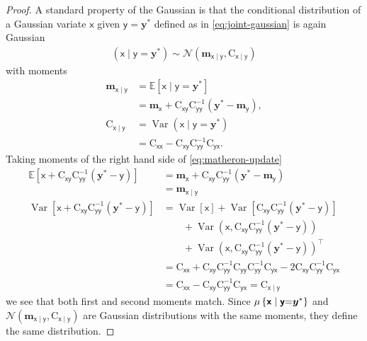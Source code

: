 \documentclass[wcp]{jmlr} %
\newcommand{\Ex}{\mathbb{E}}
\newcommand{\var}{\operatorname{Var}}
\newcommand{\vv}[1]{\boldsymbol{#1}}
\newcommand{\mm}[1]{\mathrm{#1}}
\newcommand{\rv}[1]{\mathsf{#1}}
\newcommand{\vrv}[1]{\vv{\rv{#1}}}
\newcommand{\Normal}{\mathcal{N}}
\newcommand{\gvn}{\mid}
\begin{document}
\begin{proof}
    A standard property of the Gaussian \citep[e.g.][]{Petersen2012Matrix} is that the conditional distribution of a Gaussian variate  $\vrv{x}$ given $\vrv{y} = \vv{y}^*$ defined as in \eqref{eq:joint-gaussian} is again Gaussian
    \begin{align}
        \left(\vrv{x} \gvn \vrv{y} {=} \vv{y}^*\right)
        \sim\Normal(\vv{m}_{\vrv{x}\gvn\vrv{y}}, \mm{C}_{\vrv{x}\gvn\vrv{y}})\label{eq:conditional-gaussian}
    \end{align}
    with moments
    \begin{align}
        \vv{m}_{\vrv{x}\gvn\vrv{y}}
            &=\Ex [\vrv{x} \gvn \vrv{y} {=} \vv{y}^*] \\
            &= \vv{m}_{\vrv{x}} + \mm{C}_{\vrv{xy}} \mm{C}_{\vrv{yy}}^{-1} \left( \vv{y}^* - \vv{m}_{\vrv{y}} \right), \label{eq:conditional-mean}\\
        \mm{C}_{\vrv{x}\gvn\vrv{y}}
            &= \var \left(\vrv{x} \gvn \vrv{y} {=} \vv{y}^*\right) \\
            &= \mm{C}_{\vrv{xx}} - \mm{C}_{\vrv{xy}} \mm{C}_{\vrv{yy}}^{-1} \mm{C}_{\vrv{yx}}. \label{eq:conditional-cov}
    \end{align}
Taking moments of the right hand side of \eqref{eq:matheron-update}
\begin{align}
\Ex\left[\vrv{x}+\mm{C}_{\vrv{xy}} \mm{C}_{\vrv{yy}}^{-1}(\vv{y}^*-\vrv{y})\right]
&=\vv{m}_{\vrv{x}} +\mm{C}_{\vrv{xy}}\mm{C}_{\vrv{yy}}^{-1}(\vv{y}^*-\vv{m}_{\vrv{y}})\\
&=\vv{m}_{\vrv{x}\gvn\vrv{y}}\\
\var\left[\vrv{x}+\mm{C}_{\vrv{xy}} \mm{C}_{\vrv{yy}}^{-1}(\vv{y}^*-\vrv{y})\right]
&=
    \var[\vrv{x}]+\var[\mm{C}_{\vrv{xy}} \mm{C}_{\vrv{yy}}^{-1}(\vv{y}^*-\vrv{y})] \nonumber \\
    &\hspace{2em} +\var(\vrv{x},\mm{C}_{\vrv{xy}} \mm{C}_{\vrv{yy}}^{-1}(\vv{y}^*-\vrv{y}))\nonumber \\
    &\hspace{2em} +\var(\vrv{x},\mm{C}_{\vrv{xy}} \mm{C}_{\vrv{yy}}^{-1}(\vv{y}^*-\vrv{y}))^{\top}\\
&=\mm{C}_{\vrv{x}\vrv{x}} +\mm{C}_{\vrv{xy}} \mm{C}_{\vrv{yy}}^{-1}\mm{C}_{\vrv{yy}} \mm{C}_{\vrv{yy}}^{-1}\mm{C}_{\vrv{yx}}
-  2\mm{C}_{\vrv{xy}} \mm{C}_{\vrv{yy}}^{-1}\mm{C}_{\vrv{yx}}\\
&=\mm{C}_{\vrv{x}\vrv{x}} -\mm{C}_{\vrv{xy}} \mm{C}_{\vrv{yy}}^{-1}\mm{C}_{\vrv{yx}} =\mm{C}_{\vrv{x}\gvn\vrv{y}}
\end{align}
we see that both first and second moments match.
Since $\Law\left\{\vrv{x} \gvn \vrv{y} {=} \vv{y}^*\right\}$ and
$\Normal(\vv{m}_{\vrv{x}\gvn\vrv{y}}, \mm{C}_{\vrv{x}\gvn\vrv{y}})$ are Gaussian distributions with the same moments, they define the same distribution.
\end{proof}
\end{document}
